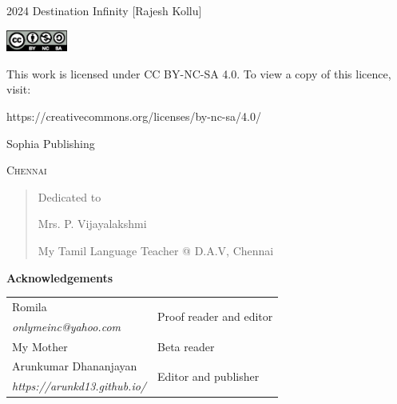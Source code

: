 
\cleardoublepage

\begin{center}
\HUGE{\thetitle}
\end{center}
\cleardoublepage

\begin{center}
\HUGE{\thetitle}
\end{center}

\begin{center}
\LARGE{\theauthor}
\end{center}

\vfill

\begin{center}
    \sophia
\end{center}
\clearpage

\begingroup
\footnotesize
\setlength{\parindent}{0pt}
\setlength{\parskip}{\baselineskip}

\textcopyright{} 2024 Destination Infinity [Rajesh Kollu]

\includegraphics[height=20pt]{by-nc-sa.eps}

This work is licensed under CC BY-NC-SA 4.0. To view a copy of this licence,
visit:

https://creativecommons.org/licenses/by-nc-sa/4.0/

\endgroup

\vfill

{\footnotesize
Sophia Publishing

\textsc{Chennai}
}

\clearpage

\begin{quote}
\begin{center}Dedicated to

\Large
Mrs. P. Vijayalakshmi
\normalsize

My Tamil Language Teacher @ D.A.V, Chennai
\end{center}
\end{quote}

\vfill

\textbf{Acknowledgements}

\footnotesize
\begin{tabular}{ll}
    Romila & \multirow{2}{*}{Proof reader and editor} \\
    \emph{onlymeinc@yahoo.com} & \\
    My Mother & Beta reader \\
    Arunkumar Dhananjayan & \multirow{2}{*}{Editor and publisher} \\
    \emph{https://arunkd13.github.io/} & \\
\end{tabular}

\clearpage